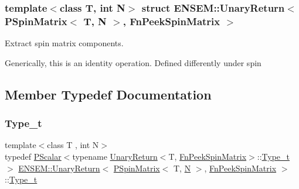 \subsubsection*{template$<$class T, int N$>$\newline
struct E\+N\+S\+E\+M\+::\+Unary\+Return$<$ P\+Spin\+Matrix$<$ T, N $>$, Fn\+Peek\+Spin\+Matrix $>$}

Extract spin matrix components. 

Generically, this is an identity operation. Defined differently under spin 

\subsection{Member Typedef Documentation}
\mbox{\label{structENSEM_1_1UnaryReturn_3_01PSpinMatrix_3_01T_00_01N_01_4_00_01FnPeekSpinMatrix_01_4_a1a718fe587d03e5619b75af54e2a19a3}} 
\subsubsection{\texorpdfstring{Type\_t}{Type\_t}\hspace{0.1cm}{\footnotesize\ttfamily [1/2]}}
{\footnotesize\ttfamily template$<$class T , int N$>$ \\
typedef \mbox{\hyperlink{classENSEM_1_1PScalar}{P\+Scalar}}$<$typename \mbox{\hyperlink{structENSEM_1_1UnaryReturn}{Unary\+Return}}$<$T, \mbox{\hyperlink{structENSEM_1_1FnPeekSpinMatrix}{Fn\+Peek\+Spin\+Matrix}}$>$\+::\mbox{\hyperlink{structENSEM_1_1UnaryReturn_3_01PSpinMatrix_3_01T_00_01N_01_4_00_01FnPeekSpinMatrix_01_4_a1a718fe587d03e5619b75af54e2a19a3}{Type\+\_\+t}}$>$ \mbox{\hyperlink{structENSEM_1_1UnaryReturn}{E\+N\+S\+E\+M\+::\+Unary\+Return}}$<$ \mbox{\hyperlink{classENSEM_1_1PSpinMatrix}{P\+Spin\+Matrix}}$<$ T, \mbox{\hyperlink{operator__name__util_8cc_a7722c8ecbb62d99aee7ce68b1752f337}{N}} $>$, \mbox{\hyperlink{structENSEM_1_1FnPeekSpinMatrix}{Fn\+Peek\+Spin\+Matrix}} $>$\+::\mbox{\hyperlink{structENSEM_1_1UnaryReturn_3_01PSpinMatrix_3_01T_00_01N_01_4_00_01FnPeekSpinMatrix_01_4_a1a718fe587d03e5619b75af54e2a19a3}{Type\+\_\+t}}}

